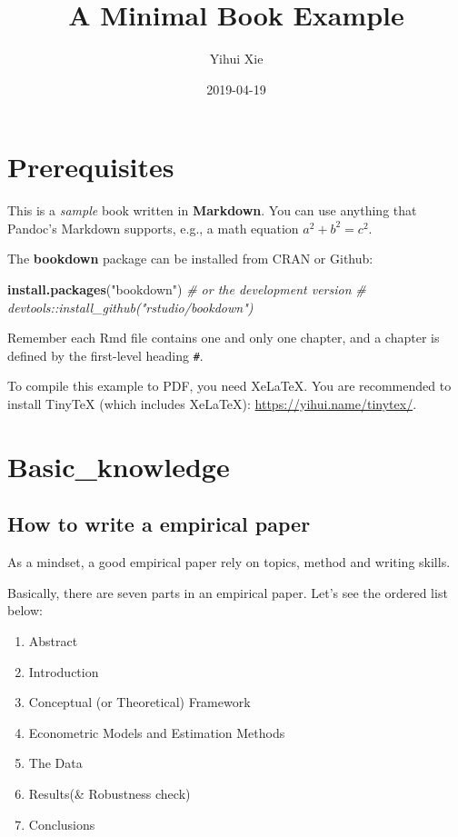 \documentclass[]{book}
\title{A Minimal Book Example}
\author{Yihui Xie}
\date{2019-04-19}
\newenvironment{Shaded}{\begin{snugshade}}{\end{snugshade}}
\newcommand{\CommentTok}[1]{\textcolor[rgb]{0.56,0.35,0.01}{\textit{#1}}}
\newcommand{\KeywordTok}[1]{\textcolor[rgb]{0.13,0.29,0.53}{\textbf{#1}}}
\newcommand{\NormalTok}[1]{#1}
\newcommand{\StringTok}[1]{\textcolor[rgb]{0.31,0.60,0.02}{#1}}
\providecommand{\tightlist}{%
  \setlength{\itemsep}{0pt}\setlength{\parskip}{0pt}}
\begin{document}
\maketitle

{
\setcounter{tocdepth}{1}
\tableofcontents
}
\hypertarget{prerequisites}{%
\chapter{Prerequisites}\label{prerequisites}}

This is a \emph{sample} book written in \textbf{Markdown}. You can use anything that Pandoc's Markdown supports, e.g., a math equation \(a^2 + b^2 = c^2\).

The \textbf{bookdown} package can be installed from CRAN or Github:

\begin{Shaded}
\begin{Highlighting}[]
\KeywordTok{install.packages}\NormalTok{(}\StringTok{"bookdown"}\NormalTok{)}
\CommentTok{# or the development version}
\CommentTok{# devtools::install_github("rstudio/bookdown")}
\end{Highlighting}
\end{Shaded}

Remember each Rmd file contains one and only one chapter, and a chapter is defined by the first-level heading \texttt{\#}.

To compile this example to PDF, you need XeLaTeX. You are recommended to install TinyTeX (which includes XeLaTeX): \url{https://yihui.name/tinytex/}.

\hypertarget{intro}{%
\chapter{Basic\_knowledge}\label{intro}}

\hypertarget{how-to-write-a-empirical-paper}{%
\section{How to write a empirical paper}\label{how-to-write-a-empirical-paper}}

As a mindset, a good empirical paper rely on topics, method and writing skills.

Basically, there are seven parts in an empirical paper. Let's see the ordered list below:

\begin{enumerate}
\def\labelenumi{\arabic{enumi}.}
\tightlist
\item
  Abstract
\item
  Introduction
\item
  Conceptual (or Theoretical) Framework
\item
  Econometric Models and Estimation Methods
\item
  The Data
\item
  Results(\& Robustness check)
\item
  Conclusions
\end{enumerate}
\end{document}
